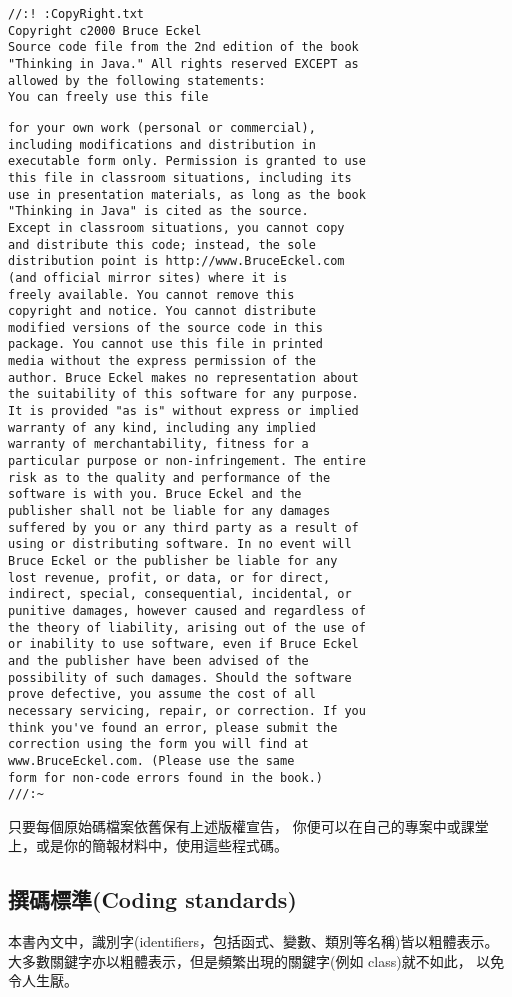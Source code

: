 \begin{Verbatim}[frame=single]
//:! :CopyRight.txt
Copyright c2000 Bruce Eckel
Source code file from the 2nd edition of the book
"Thinking in Java." All rights reserved EXCEPT as
allowed by the following statements:
You can freely use this file
\end{Verbatim}
\begin{Verbatim}[frame=single]
for your own work (personal or commercial),
including modifications and distribution in
executable form only. Permission is granted to use
this file in classroom situations, including its
use in presentation materials, as long as the book
"Thinking in Java" is cited as the source.
Except in classroom situations, you cannot copy
and distribute this code; instead, the sole
distribution point is http://www.BruceEckel.com
(and official mirror sites) where it is
freely available. You cannot remove this
copyright and notice. You cannot distribute
modified versions of the source code in this
package. You cannot use this file in printed
media without the express permission of the
author. Bruce Eckel makes no representation about
the suitability of this software for any purpose.
It is provided "as is" without express or implied
warranty of any kind, including any implied
warranty of merchantability, fitness for a
particular purpose or non-infringement. The entire
risk as to the quality and performance of the
software is with you. Bruce Eckel and the
publisher shall not be liable for any damages
suffered by you or any third party as a result of
using or distributing software. In no event will
Bruce Eckel or the publisher be liable for any
lost revenue, profit, or data, or for direct,
indirect, special, consequential, incidental, or
punitive damages, however caused and regardless of
the theory of liability, arising out of the use of
or inability to use software, even if Bruce Eckel
and the publisher have been advised of the
possibility of such damages. Should the software
prove defective, you assume the cost of all
necessary servicing, repair, or correction. If you
think you've found an error, please submit the
correction using the form you will find at
www.BruceEckel.com. (Please use the same
form for non-code errors found in the book.)
///:~
\end{Verbatim}

只要每個原始碼檔案依舊保有上述版權宣告，
你便可以在自己的專案中或課堂上，或是你的簡報材料中，使用這些程式碼。

\subsection{撰碼標準(Coding standards)}
本書內文中，識別字(identifiers，包括函式、變數、類別等名稱)皆以粗體表示。
大多數關鍵字亦以粗體表示，但是頻繁出現的關鍵字(例如 class)就不如此，
以免令人生厭。

